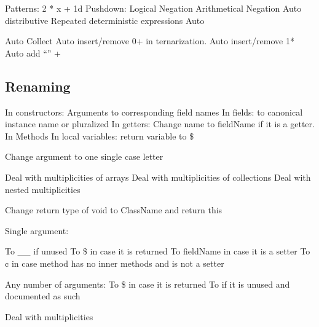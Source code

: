 \begin{description}
      Patterns: 2 * x + 1d
      Pushdown:
      Logical Negation
      Arithmetical Negation
      Auto distributive
      Repeated deterministic expressions
      Auto

              Auto Collect
              Auto insert/remove 0+ in ternarization.
              Auto insert/remove 1*
              Auto add “” +

  \subsection{Renaming}

      In constructors: Arguments to corresponding field names
      In fields: to canonical instance name or pluralized
      In getters: Change name to fieldName if it is a getter.
      In Methods
      In local variables:
      return variable to \$

    Change argument to one single case letter

            Deal with multiplicities of arrays
            Deal with multiplicities of collections
            Deal with nested multiplicities

    Change return type of void to ClassName and return this

            Single argument:

                    To \_\_ if unused
                    To \$ in case it is returned
                    To fieldName in case it is a setter
                    To ¢ in case method has no inner methods and is not a
                        setter

                    Any number of arguments:
                    To \$ in case it is returned
                    To \cc{\_\_}
                        if it is unused and documented as such

            Deal with multiplicities

%
%


\end{description}
